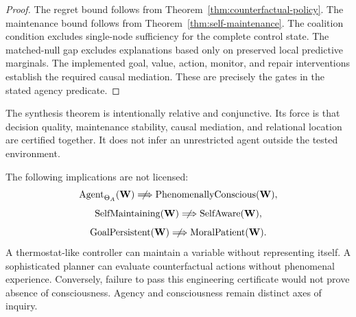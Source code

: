 \begin{proof}
The regret bound follows from
Theorem~\ref{thm:counterfactual-policy}. The maintenance bound follows from
Theorem~\ref{thm:self-maintenance}. The coalition condition excludes
single-node sufficiency for the complete control state. The matched-null gap
excludes explanations based only on preserved local predictive marginals. The
implemented goal, value, action, monitor, and repair interventions establish
the required causal mediation. These are precisely the gates in the stated
agency predicate.
\end{proof}

The synthesis theorem is intentionally relative and conjunctive. Its force is
that decision quality, maintenance stability, causal mediation, and relational
location are certified together. It does not infer an unrestricted agent
outside the tested environment.


The following implications are not licensed:
\[
\operatorname{Agent}_{\Theta_A}(\Workspace)
\centernot\Longrightarrow
\operatorname{PhenomenallyConscious}(\Workspace),
\]
\[
\operatorname{SelfMaintaining}(\Workspace)
\centernot\Longrightarrow
\operatorname{SelfAware}(\Workspace),
\]
\[
\operatorname{GoalPersistent}(\Workspace)
\centernot\Longrightarrow
\operatorname{MoralPatient}(\Workspace).
\]
A thermostat-like controller can maintain a variable without representing
itself. A sophisticated planner can evaluate counterfactual actions without
phenomenal experience. Conversely, failure to pass this engineering
certificate would not prove absence of consciousness. Agency and
consciousness remain distinct axes of inquiry.
